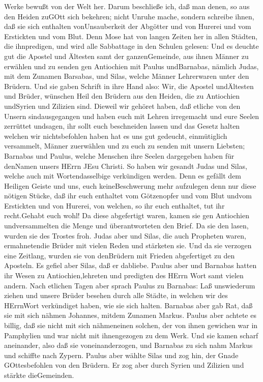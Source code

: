 Werke bewußt von der Welt her.  Darum beschließe ich, daß
man denen, so aus den Heiden zuGOtt sich bekehren; nicht Unruhe mache,
 sondern schreibe ihnen, daß sie sich enthalten
vonUnsauberkeit der Abgötter und von Hurerei und vom Erstickten und vom
Blut.  Denn Mose hat von langen Zeiten her in allen
Städten, die ihnpredigen, und wird alle Sabbattage in den Schulen
gelesen:  Und es deuchte gut die Apostel und Ältesten samt
der ganzenGemeinde, aus ihnen Männer zu erwählen und zu senden gen
Antiochien mit Paulus undBarnabas, nämlich Judas, mit dem Zunamen
Barsabas, und Silas, welche Männer Lehrerwaren unter den Brüdern.
 Und sie gaben Schrift in ihre Hand also: Wir, die Apostel
undÄltesten und Brüder, wünschen Heil den Brüdern aus den Heiden, die zu
Antiochien undSyrien und Zilizien sind.  Dieweil wir
gehöret haben, daß etliche von den Unsern sindausgegangen und haben euch
mit Lehren irregemacht und eure Seelen zerrüttet undsagen, ihr sollt
euch beschneiden lassen und das Gesetz halten welchen wir nichtsbefohlen
haben  hat es uns gut gedeucht, einmütiglich versammelt,
Männer zuerwählen und zu euch zu senden mit unsern Liebsten; Barnabas
und Paulus,  welche Menschen ihre Seelen dargegeben haben
für denNamen unsers HErrn JEsu Christi.  So haben wir
gesandt Judas und Silas, welche auch mit Wortendasselbige verkündigen
werden.  Denn es gefällt dem Heiligen Geiste und uns, euch
keineBeschwerung mehr aufzulegen denn nur diese nötigen Stücke,
 daß ihr euch enthaltet vom Götzenopfer und vom Blut undvom
Erstickten und von Hurerei, von welchen, so ihr euch enthaltet, tut ihr
recht.Gehabt euch wohl!  Da diese abgefertigt waren, kamen
sie gen Antiochien undversammelten die Menge und überantworteten den
Brief.  Da sie den lasen, wurden sie des Trostes froh.
 Judas aber und Silas, die auch Propheten waren,
ermahnetendie Brüder mit vielen Reden und stärketen sie. 
Und da sie verzogen eine Zeitlang, wurden sie von denBrüdern mit Frieden
abgefertiget zu den Aposteln.  Es gefiel aber Silas, daß er
dabliebe.  Paulus aber und Barnabas hatten ihr Wesen zu
Antiochien,lehreten und predigten des HErrn Wort samt vielen andern.
 Nach etlichen Tagen aber sprach Paulus zu Barnabas: Laß
unswiederum ziehen und unsere Brüder besehen durch alle Städte, in
welchen wir des HErrnWort verkündiget haben, wie sie sich halten.
 Barnabas aber gab Rat, daß sie mit sich nähmen Johannes,
mitdem Zunamen Markus.  Paulus aber achtete es billig, daß
sie nicht mit sich nähmeneinen solchen, der von ihnen gewichen war in
Pamphylien und war nicht mit ihnengezogen zu dem Werk.  Und
sie kamen scharf aneinander, also daß sie voneinanderzogen, und Barnabas
zu sich nahm Markus und schiffte nach Zypern.  Paulus aber
wählte Silas und zog hin, der Gnade GOttesbefohlen von den Brüdern.
 Er zog aber durch Syrien und Zilizien und stärkte
dieGemeinden.

